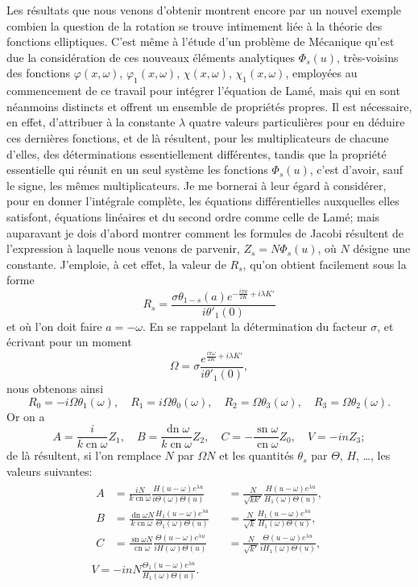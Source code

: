 \documentclass[11pt,leqno,oneside,letterpaper]{book}[2005/09/16]
\DeclareMathOperator{\sn}{sn}
\DeclareMathOperator{\cn}{cn}
\DeclareMathOperator{\dn}{dn}
\begin{document}
Les r\'esultats que nous venons d'obtenir montrent encore par un
nouvel exemple combien la question de la rotation se trouve intimement
li\'ee \`a la th\'eorie des fonctions elliptiques. C'est m\^eme \`a l'\'etude d'un probl\`eme
de M\'ecanique qu'est due la consid\'eration de ces nouveaux \'el\'ements
analytiques $\Phi_s(u)$, tr\`es-voisins des fonctions $\varphi(x,\omega)$, $\varphi_1(x,\omega)$,
$\chi(x,\omega)$, $\chi_1(x,\omega)$, employ\'ees au commencement de ce travail pour int\'egrer
l'\'equation de Lam\'e, mais qui en sont n\'eanmoins distincts et offrent un
ensemble de propri\'et\'es propres. Il est n\'ecessaire, en effet, d'attribuer \`a la
constante $\lambda$ quatre valeurs particuli\`eres pour en d\'eduire ces derni\`eres
fonctions, et de l\`a r\'esultent, pour les multiplicateurs de chacune d'elles,
des d\'eterminations essentiellement diff\'erentes, tandis que la propri\'et\'e
essentielle qui r\'eunit en un seul syst\`eme les fonctions $\Phi_s(u)$, c'est d'avoir,
sauf le signe, les m\^emes multiplicateurs. Je me bornerai \`a leur \'egard \`a
consid\'erer, pour en donner l'int\'egrale compl\`ete, les \'equations diff\'erentielles
auxquelles elles satisfont, \'equations lin\'eaires et du second ordre
comme celle de Lam\'e; mais auparavant je dois d'abord montrer comment
les formules de Jacobi r\'esultent de l'expression \`a laquelle nous venons
de parvenir, $Z_s=N\Phi_s(u)$, o\`u $N$ d\'esigne une constante. J'emploie, \`a cet
effet, la valeur de $R_s$, qu'on obtient facilement sous la forme
\[
R_s = \frac{\sigma\theta_{1-s}(a) e^{-\frac{i\pi a}{2K}+i\lambda K'}}{i\theta'_1(0)}
\]
et o\`u l'on doit faire $a = -\omega$. En se rappelant la d\'etermination du facteur
$\sigma$, et \'ecrivant pour un moment
\[
\Omega = \sigma\frac{e^{\frac{i\pi\omega}{2K}+i\lambda K'}}{i\theta'_1(0)},
\]
nous obtenons ainsi
\[
R_0 = -i\Omega\theta_1(\omega),\quad
  R_1 = i\Omega\theta_0(\omega),\quad
  R_2 = \Omega\theta_3(\omega),\quad
  R_3 = \Omega\theta_2(\omega).
\]
Or on a
\[
A = \frac{i}{k\cn\omega}Z_1,\quad
  B = \frac{\dn\omega}{k\cn\omega}Z_2,\quad
  C = -\frac{\sn\omega}{\cn\omega}Z_0,\quad
  V = -inZ_3;
\]
de l\`a r\'esultent, si l'on remplace $N$ par $\Omega N$ et les quantit\'es $\theta_s$ par $\Theta$, $H$, \ldots,
les valeurs suivantes:
\begin{gather*}
\begin{alignedat}{2}
A &= \frac{iN}{k\cn\omega}\frac{H(u-\omega)e^{\lambda u}}{i\Theta(\omega)\Theta(u)}
  &&= \frac{N}{\sqrt{kk'}}\frac{H(u-\omega)e^{\lambda u}}{H_1(\omega)\Theta(u)},\\
B &= \frac{\dn\omega N}{k\cn\omega}\frac{H_1(u-\omega)e^{\lambda u}}{\Theta_1(\omega)\Theta(u)}
  &&= \frac{N}{\sqrt{k}}\frac{H_1(u-\omega)e^{\lambda u}}{H_1(\omega)\Theta(u)},\\
C &= \frac{\sn\omega N}{\cn\omega}\frac{\Theta(u-\omega)e^{\lambda u}}{iH(\omega)\Theta(u)}
  &&= \frac{N}{\sqrt{k'}}\frac{\Theta(u-\omega)e^{\lambda u}}{iH_1(\omega)\Theta(u)},
\end{alignedat}\\
V = -inN\frac{\Theta_1(u-\omega)e^{\lambda u}}{H_1(\omega)\Theta(u)}.
\end{gather*}
\end{document}
